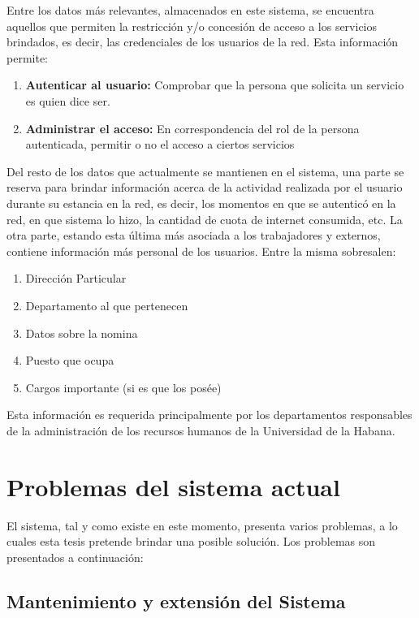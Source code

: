 Entre los datos m\'as relevantes, almacenados en este sistema, se encuentra aquellos que permiten la restricci\'on y/o concesi\'on de acceso a los servicios brindados, es decir, las credenciales de los usuarios de la red. Esta informaci\'on permite:

\begin{enumerate}
\item {\bf Autenticar al usuario:} Comprobar que la persona que solicita un servicio es quien dice ser.
\item {\bf Administrar el acceso:} En correspondencia del rol de la persona autenticada, permitir o no el acceso a ciertos servicios
\end{enumerate}

Del resto de los datos que actualmente se mantienen en el sistema, una parte se reserva para brindar informaci\'on acerca de la actividad realizada por el usuario durante su estancia en la red, es decir, los momentos en que se autentic\'o en la red, en que sistema lo hizo, la cantidad de cuota de internet consumida, etc. La otra parte, estando esta \'ultima m\'as asociada a los trabajadores y externos, contiene informaci\'on m\'as personal de los usuarios. Entre la misma sobresalen: 

\begin{enumerate}
	\item Direcci\'on Particular
	\item Departamento al que pertenecen
	\item Datos sobre la nomina
	\item Puesto que ocupa
	\item Cargos importante (si es que los pos\'ee)
\end{enumerate}

Esta informaci\'on es requerida principalmente por los departamentos responsables de la administraci\'on de los recursos humanos de la Universidad de la Habana.

\section{Problemas del sistema actual}

El sistema, tal y como existe en este momento, presenta varios problemas, a lo cuales esta tesis pretende brindar una posible soluci\'on. Los problemas son presentados a continuaci\'on:

\subsection{Mantenimiento y extensi\'on del Sistema}

